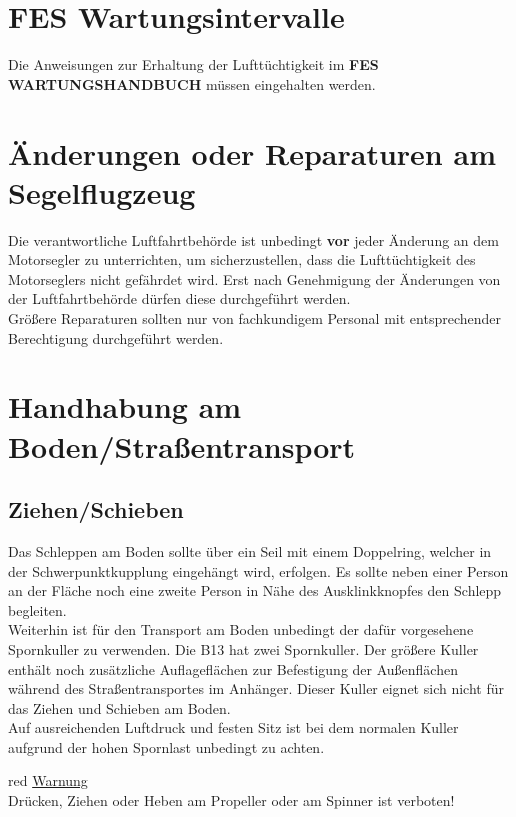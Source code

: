 \section{FES Wartungsintervalle}

Die Anweisungen zur Erhaltung der Lufttüchtigkeit im \textbf{FES WARTUNGSHANDBUCH} müssen eingehalten werden.

\section{Änderungen oder Reparaturen am Segelflugzeug}
Die verantwortliche Luftfahrtbehörde ist unbedingt \textbf{vor} jeder Änderung an dem Motorsegler zu unterrichten, um sicherzustellen, dass die Lufttüchtigkeit des Motorseglers nicht gefährdet wird. Erst nach Genehmigung der Änderungen von der Luftfahrtbehörde dürfen diese durchgeführt werden. \\
\newline
Größere Reparaturen sollten nur von fachkundigem Personal mit entsprechender Berechtigung durchgeführt werden. 
\newpage
\section{Handhabung am Boden/Straßentransport}

\subsection{Ziehen/Schieben}
Das Schleppen am Boden sollte über ein Seil mit einem Doppelring, welcher in der Schwerpunktkupplung eingehängt wird, erfolgen. Es sollte neben einer Person an der Fläche noch eine zweite Person in Nähe des Ausklinkknopfes den Schlepp begleiten. \\
\newline
Weiterhin ist für den Transport am Boden unbedingt der dafür vorgesehene Spornkuller zu verwenden. Die B13 hat zwei Spornkuller. Der größere Kuller enthält noch zusätzliche Auflageflächen zur Befestigung der Außenflächen während des Straßentransportes im Anhänger. Dieser Kuller eignet sich nicht für das Ziehen und Schieben am Boden. \\
Auf ausreichenden Luftdruck und festen Sitz ist bei dem normalen Kuller aufgrund der hohen Spornlast unbedingt zu achten.\\
\newline

\begin{color}{red}
\large{\underline{Warnung}}\\
Drücken, Ziehen oder Heben am Propeller oder am Spinner ist verboten!
\end{color}\\

